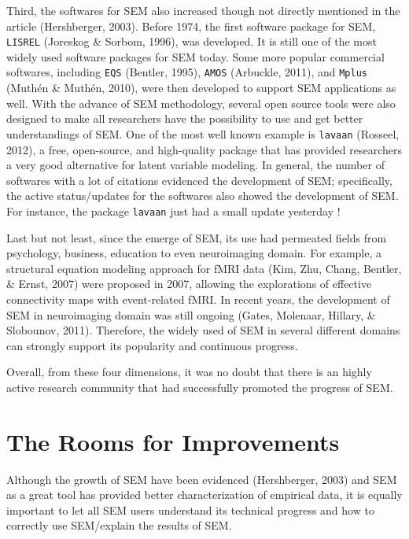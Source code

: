 \documentclass[jou]{apa6}
\theoremstyle{definition}
\theoremstyle{definition}
\theoremstyle{definition}
\theoremstyle{remark}
\begin{document}
Third, the softwares for SEM also increased though not directly
mentioned in the article (Hershberger, 2003). Before 1974, the first
software package for SEM, \texttt{LISREL} (Joreskog \& Sorbom, 1996),
was developed. It is still one of the most widely used software packages
for SEM today. Some more popular commercial softwares, including
\texttt{EQS} (Bentler, 1995), \texttt{AMOS} (Arbuckle, 2011), and
\texttt{Mplus} (Muthén \& Muthén, 2010), were then developed to support
SEM applications as well. With the advance of SEM methodology, several
open source tools were also designed to make all researchers have the
possibility to use and get better understandings of SEM. One of the most
well known example is \texttt{lavaan} (Rosseel, 2012), a free,
open-source, and high-quality package that has provided researchers a
very good alternative for latent variable modeling. In general, the
number of softwares with a lot of citations evidenced the development of
SEM; specifically, the active status/updates for the softwares also
showed the development of SEM. For instance, the package \texttt{lavaan}
just had a small update yesterday !

Last but not least, since the emerge of SEM, its use had permeated
fields from psychology, business, education to even neuroimaging domain.
For example, a structural equation modeling approach for fMRI data (Kim,
Zhu, Chang, Bentler, \& Ernst, 2007) were proposed in 2007, allowing the
explorations of effective connectivity maps with event-related fMRI. In
recent years, the development of SEM in neuroimaging domain was still
ongoing (Gates, Molenaar, Hillary, \& Slobounov, 2011). Therefore, the
widely used of SEM in several different domains can strongly support its
popularity and continuous progress.

Overall, from these four dimensions, it was no doubt that there is an
highly active research community that had successfully promoted the
progress of SEM.

\hypertarget{the-rooms-for-improvements}{%
\section{The Rooms for Improvements}\label{the-rooms-for-improvements}}

\noindent Although the growth of SEM have been evidenced (Hershberger,
2003) and SEM as a great tool has provided better characterization of
empirical data, it is equally important to let all SEM users understand
its technical progress and how to correctly use SEM/explain the results
of SEM.
\end{document}
